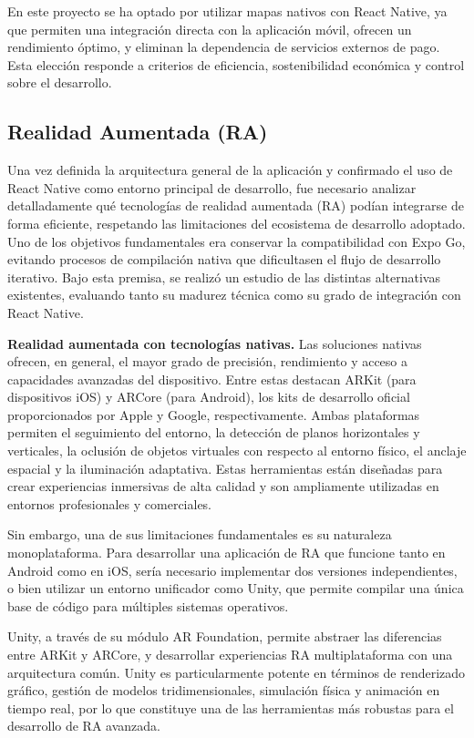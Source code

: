 En este proyecto se ha optado por utilizar mapas nativos con React Native, ya que permiten una integración directa con la aplicación móvil, ofrecen un rendimiento óptimo, y eliminan la dependencia de servicios externos de pago. Esta elección responde a criterios de eficiencia, sostenibilidad económica y control sobre el desarrollo.

\subsection{Realidad Aumentada (RA)}

Una vez definida la arquitectura general de la aplicación y confirmado el uso de React Native como entorno principal de desarrollo, fue necesario analizar detalladamente qué tecnologías de realidad aumentada (RA) podían integrarse de forma eficiente, respetando las limitaciones del ecosistema de desarrollo adoptado. Uno de los objetivos fundamentales era conservar la compatibilidad con Expo Go, evitando procesos de compilación nativa que dificultasen el flujo de desarrollo iterativo. Bajo esta premisa, se realizó un estudio de las distintas alternativas existentes, evaluando tanto su madurez técnica como su grado de integración con React Native.

\textbf{Realidad aumentada con tecnologías nativas.}
Las soluciones nativas ofrecen, en general, el mayor grado de precisión, rendimiento y acceso a capacidades avanzadas del dispositivo. Entre estas destacan ARKit (para dispositivos iOS) y ARCore (para Android), los kits de desarrollo oficial proporcionados por Apple y Google, respectivamente. Ambas plataformas permiten el seguimiento del entorno, la detección de planos horizontales y verticales, la oclusión de objetos virtuales con respecto al entorno físico, el anclaje espacial y la iluminación adaptativa. Estas herramientas están diseñadas para crear experiencias inmersivas de alta calidad y son ampliamente utilizadas en entornos profesionales y comerciales.

Sin embargo, una de sus limitaciones fundamentales es su naturaleza monoplataforma. Para desarrollar una aplicación de RA que funcione tanto en Android como en iOS, sería necesario implementar dos versiones independientes, o bien utilizar un entorno unificador como Unity, que permite compilar una única base de código para múltiples sistemas operativos.

Unity, a través de su módulo AR Foundation, permite abstraer las diferencias entre ARKit y ARCore, y desarrollar experiencias RA multiplataforma con una arquitectura común. Unity es particularmente potente en términos de renderizado gráfico, gestión de modelos tridimensionales, simulación física y animación en tiempo real, por lo que constituye una de las herramientas más robustas para el desarrollo de RA avanzada.

